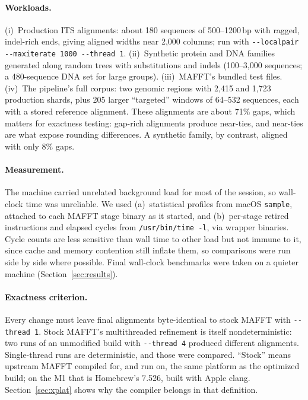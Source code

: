 \documentclass[11pt]{article}
\newcommand{\code}[1]{\texttt{#1}}
\begin{document}
\paragraph{Workloads.}
(i)~Production ITS alignments: about 180 sequences of 500--1200\,bp with ragged,
indel-rich ends, giving aligned widths near 2{,}000 columns; run with
\code{-{}-localpair -{}-maxiterate 1000 -{}-thread 1}.
(ii)~Synthetic protein and DNA families generated along random trees with substitutions and
indels (100--3{,}000 sequences; a 480-sequence DNA set for large groups).
(iii)~MAFFT's bundled test files.
(iv)~The pipeline's full corpus: two genomic regions with 2{,}415 and 1{,}723 production
shards, plus 205 larger ``targeted'' windows of 64--532 sequences, each with a stored
reference alignment. These alignments are about 71\% gaps, which matters for exactness
testing: gap-rich alignments produce near-ties, and near-ties are what expose rounding
differences. A synthetic family, by contrast, aligned with only 8\% gaps.

\paragraph{Measurement.} The machine carried unrelated background load for most of the
session, so wall-clock time was unreliable. We used (a)~statistical profiles from macOS
\code{sample}, attached to each MAFFT stage binary as it started, and (b)~per-stage retired
instructions and elapsed cycles from \code{/usr/bin/time -l}, via wrapper binaries. Cycle
counts are less sensitive than wall time to other load but not immune to it, since cache
and memory contention still inflate them, so comparisons were run side by side where possible. Final
wall-clock benchmarks were taken on a quieter machine (Section~\ref{sec:results}).

\paragraph{Exactness criterion.} Every change must leave final alignments byte-identical to
stock MAFFT with \code{-{}-thread 1}. Stock MAFFT's multithreaded refinement is itself
nondeterministic: two runs of an unmodified build with \code{-{}-thread 4} produced different
alignments. Single-thread runs are deterministic, and those were compared. ``Stock'' means
upstream MAFFT compiled for, and run on, the same platform as the optimized build; on the M1
that is Homebrew's 7.526, built with Apple clang. Section~\ref{sec:xplat} shows why the
compiler belongs in that definition.
\end{document}
